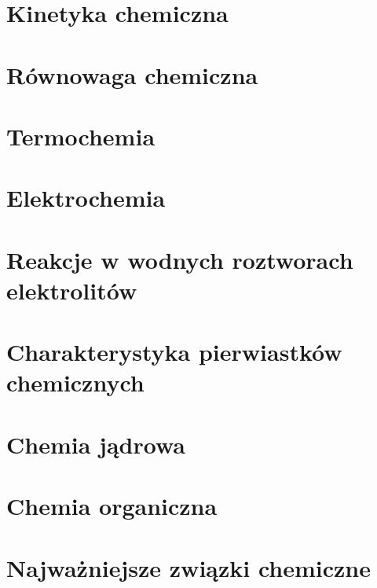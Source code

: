 \documentclass{createspace}
\begin{document}
\chapter{Kinetyka chemiczna}


\chapter{Równowaga chemiczna}


\chapter{Termochemia}


\chapter{Elektrochemia}


\chapter{Reakcje w wodnych roztworach elektrolitów}

\chapter{Charakterystyka pierwiastków chemicznych}






\chapter{Chemia jądrowa}


\chapter{Chemia organiczna}

\chapter{Najważniejsze związki chemiczne}




\end{document}
